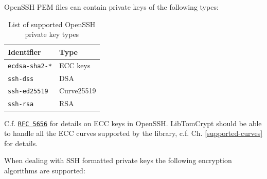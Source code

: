 \documentclass[synpaper]{book}
\begin{document}
OpenSSH PEM files can contain private keys of the following types:

\begin{table}[H]
\begin{small}
\begin{tabular}{|l|l|}
\hline \textbf{Identifier}    & \textbf{Type} \\
\hline \texttt{ecdsa-sha2-*}  & ECC keys \\
\hline \texttt{ssh-dss}       & DSA \\
\hline \texttt{ssh-ed25519}   & Curve25519 \\
\hline \texttt{ssh-rsa}       & RSA \\
\hline
\end{tabular}
\end{small}
\caption{List of supported OpenSSH private key types}
\label{supported-openssh-private-key-types}
\end{table}

C.f. \href{https://datatracker.ietf.org/doc/html/rfc5656}{\texttt{RFC 5656}} for details on ECC keys
in OpenSSH.  LibTomCrypt should be able to handle all the ECC curves supported by the library,
c.f. Ch. \ref{supported-curves} for details.

When dealing with SSH formatted private keys the following encryption algorithms are supported:
\end{document}
